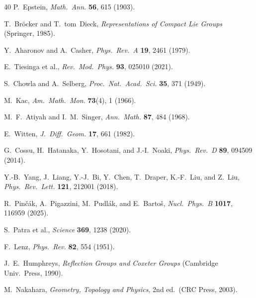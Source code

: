 \documentclass[11pt,a4paper]{article}
\theoremstyle{definition}
\theoremstyle{remark}
\begin{document}
\begin{thebibliography}{40}
  P.~Epstein, \emph{Math.\ Ann.} \textbf{56}, 615 (1903).

  T.~Br\"ocker and T.~tom~Dieck,
  \emph{Representations of Compact Lie Groups}
  (Springer, 1985).

  Y.~Aharonov and A.~Casher,
  \emph{Phys.\ Rev.\ A} \textbf{19}, 2461 (1979).

  E.~Tiesinga et al., \emph{Rev.\ Mod.\ Phys.} \textbf{93}, 025010 (2021).

  S.~Chowla and A.~Selberg, \emph{Proc.\ Nat.\ Acad.\ Sci.}
  \textbf{35}, 371 (1949).

  M.~Kac, \emph{Am.\ Math.\ Mon.} \textbf{73}(4), 1 (1966).

  M.~F.~Atiyah and I.~M.~Singer, \emph{Ann.\ Math.} \textbf{87}, 484 (1968).

  E.~Witten, \emph{J.\ Diff.\ Geom.} \textbf{17}, 661 (1982).

  G.~Cossu, H.~Hatanaka, Y.~Hosotani, and J.-I.~Noaki,
  \emph{Phys.\ Rev.\ D} \textbf{89}, 094509 (2014).

  Y.-B.~Yang, J.~Liang, Y.-J.~Bi, Y.~Chen, T.~Draper, K.-F.~Liu,
  and Z.~Liu, \emph{Phys.\ Rev.\ Lett.} \textbf{121}, 212001 (2018).

  R.~Pin\v{c}\'ak, A.~Pigazzini, M.~Pudl\'ak, and E.~Barto\v{s},
  \emph{Nucl.\ Phys.\ B} \textbf{1017}, 116959 (2025).

  S.~Patra et al., \emph{Science} \textbf{369}, 1238 (2020).

  F.~Lenz, \emph{Phys.\ Rev.} \textbf{82}, 554 (1951).

  J.~E.~Humphreys, \emph{Reflection Groups and Coxeter Groups}
  (Cambridge Univ.\ Press, 1990).

  M.~Nakahara, \emph{Geometry, Topology and Physics},
  2nd ed.\ (CRC Press, 2003).


\end{thebibliography}
\end{document}
